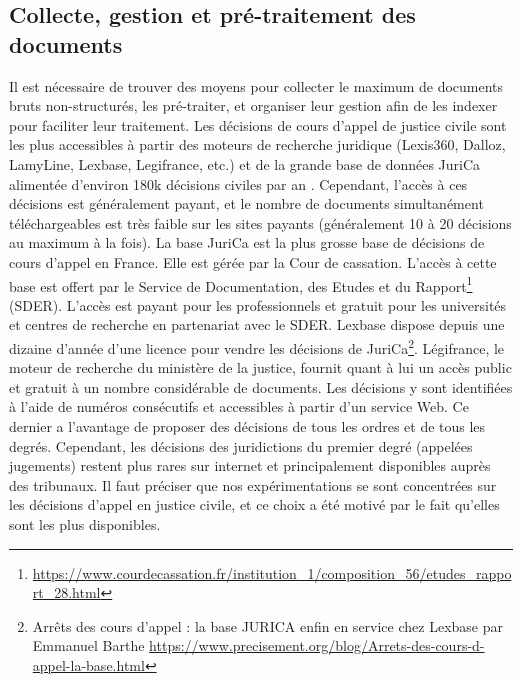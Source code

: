 \subsection{Collecte, gestion et pré-traitement des documents}
Il est nécessaire de trouver des moyens pour collecter le maximum de documents bruts non-structurés, les pré-traiter, et organiser leur gestion afin de les indexer pour faciliter leur traitement. Les décisions de cours d'appel de justice civile sont les plus accessibles à partir des moteurs de recherche juridique (Lexis360, Dalloz, LamyLine, Lexbase, Legifrance, etc.) et de la grande base de données JuriCa alimentée d'environ 180k décisions civiles par an \citep{lamanda2010}. Cependant, l'accès à ces décisions est généralement payant, et le nombre de documents simultanément téléchargeables est très faible sur les sites payants (généralement 10 à 20 décisions au maximum à la fois). La base JuriCa est la plus grosse base de décisions de cours d'appel en France. Elle est gérée par la Cour de cassation. L'accès à cette base est offert par le Service de Documentation, des Etudes et du Rapport\footnote{\url{https://www.courdecassation.fr/institution_1/composition_56/etudes_rapport_28.html}} (SDER). L'accès est payant pour les professionnels et gratuit pour les universités et centres de recherche en partenariat avec le SDER. Lexbase dispose depuis une dizaine d'année d'une licence pour vendre les décisions de JuriCa\footnote{Arrêts des cours d’appel : la base JURICA enfin en service chez Lexbase par  Emmanuel Barthe \url{https://www.precisement.org/blog/Arrets-des-cours-d-appel-la-base.html}}. Légifrance, le moteur de recherche du ministère de la justice, fournit quant à lui un accès public et gratuit à un nombre considérable de documents. Les décisions y sont identifiées à l'aide de numéros consécutifs et accessibles à partir d'un service Web. Ce dernier a l'avantage de proposer des décisions de tous les ordres et de tous les degrés. Cependant, les décisions des juridictions du premier degré (appelées jugements) restent plus rares sur internet et principalement disponibles auprès des tribunaux. Il faut préciser que nos expérimentations se sont concentrées sur les décisions d'appel en justice civile, et ce choix a été motivé par le fait qu'elles sont les plus disponibles.

